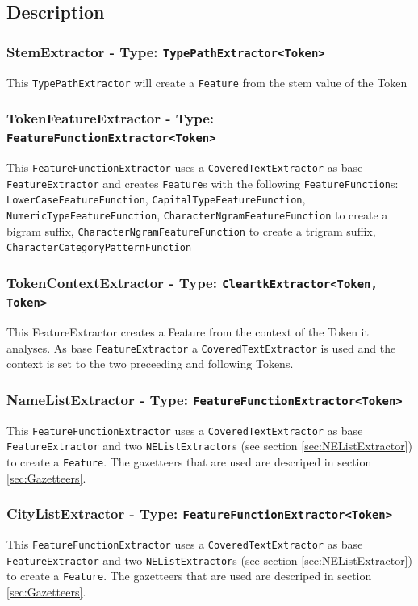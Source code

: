\documentclass[11pt, english]{article}
\begin{document}
\subsection{Description}

\subsubsection*{StemExtractor - Type: \texttt{TypePathExtractor<Token>}}
This \verb/TypePathExtractor/ will create a \verb/Feature/ from the stem value of the Token

\subsubsection*{TokenFeatureExtractor - Type: \texttt{FeatureFunctionExtractor<Token>}}
This \verb/FeatureFunctionExtractor/ uses a \verb/CoveredTextExtractor/ as base \verb/FeatureExtractor/ and creates \verb/Feature/s with the following \verb/FeatureFunction/s: \verb/LowerCaseFeatureFunction/, \verb/CapitalTypeFeatureFunction/, \verb/NumericTypeFeatureFunction/, \verb/CharacterNgramFeatureFunction/ to create a bigram suffix, \verb/CharacterNgramFeatureFunction/ to create a trigram suffix, \verb/CharacterCategoryPatternFunction/

\subsubsection*{TokenContextExtractor - Type: \texttt{CleartkExtractor<Token, Token>}}
This FeatureExtractor creates a Feature from the context of the Token it analyses. As base \verb/FeatureExtractor/ a \verb/CoveredTextExtractor/ is used and the context is set to the two preceeding and following Tokens.

\subsubsection*{NameListExtractor - Type: \texttt{FeatureFunctionExtractor<Token>}}
This \verb/FeatureFunctionExtractor/ uses a \verb/CoveredTextExtractor/ as base \verb/FeatureExtractor/ and two \verb/NEListExtractor/s (see section \ref{sec:NEListExtractor}) to create a \verb/Feature/. The gazetteers that are used are descriped in section \ref{sec:Gazetteers}.

\subsubsection*{CityListExtractor - Type: \texttt{FeatureFunctionExtractor<Token>}}
This \verb/FeatureFunctionExtractor/ uses a \verb/CoveredTextExtractor/ as base \verb/FeatureExtractor/ and two \verb/NEListExtractor/s (see section \ref{sec:NEListExtractor}) to create a \verb/Feature/. The gazetteers that are used are descriped in section \ref{sec:Gazetteers}.
\end{document}
